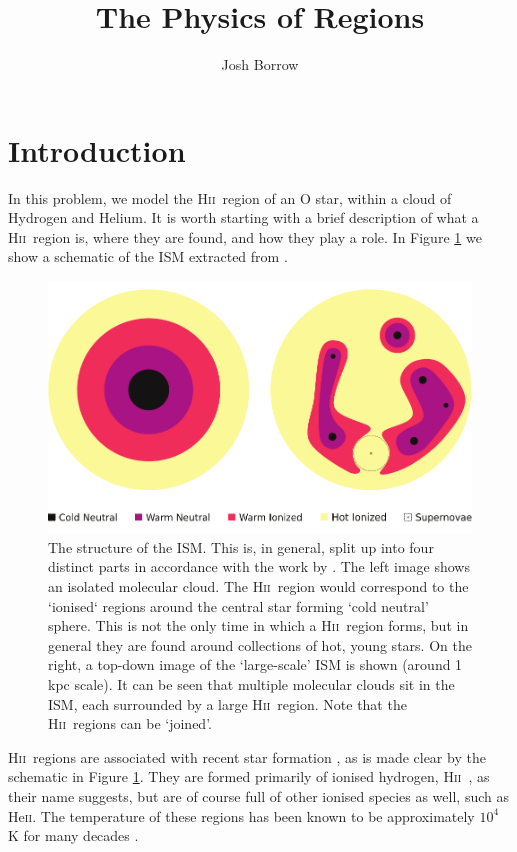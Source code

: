 \documentclass[a4paper]{article}
\title{The Physics of \hii Regions}\label{the-physics-of-hii-regions}
\author{Josh Borrow}
\newcommand{\hii}{H\textsc{ii}~}
\begin{document}
\maketitle

\section{Introduction}

In this problem, we model the \hii region of an O star, within a cloud of
Hydrogen and Helium. It is worth starting with a brief description of what a
\hii region is, where they are found, and how they play a role. In Figure
\ref{fig:hiidiagram} we show a schematic of the ISM extracted from
\citet{borrow_towards_2017}.

\begin{figure}[!h]
    \centering
    \includegraphics[width=\textwidth]{structure.pdf}
    \caption{The structure of the ISM. This is, in general, split up into four
        distinct parts in accordance with the work by
        \citet{mckee_theory_1977}.  The left image shows an isolated molecular
        cloud. The \hii region would correspond to the `ionised` regions around
        the central star forming `cold neutral' sphere. This is not the only
        time in which a \hii region forms, but in general they are found around
        collections of hot, young stars. On the right, a top-down image of the
        `large-scale' ISM is shown (around 1 kpc scale). It can be seen that
        multiple molecular clouds sit in the ISM, each surrounded by a large
        \hii region. Note that the \hii regions can be `joined'.}
    \label{fig:hiidiagram}
\end{figure}

\hii regions are associated with recent star formation
\citep{anderson_molecular_2009}, as is made clear by the schematic in Figure
\ref{fig:hiidiagram}.  They are formed primarily of ionised hydrogen, \hii, as
their name suggests, but are of course full of other ionised species as well,
such as He\textsc{ii}.  The temperature of these regions has been known to be
approximately $10^4$ K for many decades \citep{peimbert_temperature_1967}.
\end{document}
